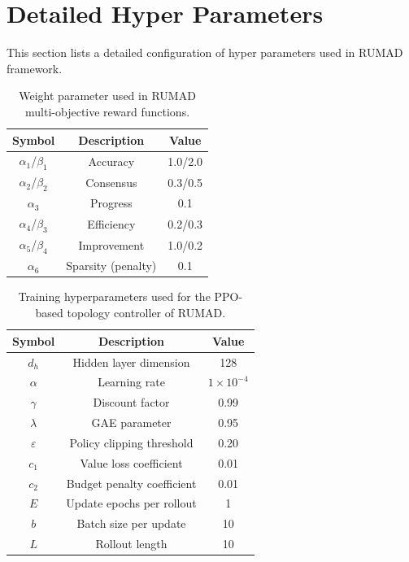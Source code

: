 
\section{Detailed Hyper Parameters}
This section lists a detailed configuration of hyper parameters used in RUMAD framework.

\begin{table}[h]
\setlength{\tabcolsep}{5mm}
\centering
\caption{Weight parameter used in RUMAD multi-objective reward functions.}
\begin{tabular}{ccc}
\toprule
\textbf{Symbol} & \textbf{Description} & \textbf{Value} \\ \midrule
$\alpha_1$/$\beta_1$  & Accuracy              & 1.0/2.0     \\
$\alpha_2$/$\beta_2$  & Consensus             & 0.3/0.5     \\
$\alpha_3$  & Progress              & 0.1     \\
$\alpha_4$/$\beta_3$  & Efficiency            & 0.2/0.3     \\
$\alpha_5$/$\beta_4$  & Improvement           & 1.0/0.2      \\
$\alpha_6$  & Sparsity (penalty)    & 0.1      \\
\bottomrule           
\end{tabular}%
\label{tab:reward_weight_parameter}
\end{table}


\begin{table}[h]
\centering
\caption{Training hyperparameters used for the PPO-based topology controller of RUMAD.}
\begin{tabular}{ccc}
\toprule
{\color[HTML]{000000} \textbf{Symbol}} & \textbf{Description} & {\color[HTML]{000000} \textbf{Value}} \\ \midrule
$d_h$ & Hidden layer dimension & 128 \\
$\alpha$ & Learning rate & $1\times10^{-4}$ \\
$\gamma$ & Discount factor & 0.99 \\
$\lambda$ & GAE parameter & 0.95 \\
$\varepsilon$ & Policy clipping threshold & 0.20 \\
$c_1$ & Value loss coefficient & 0.01 \\
$c_2$ & Budget penalty coefficient & 0.01 \\
$E$ & Update epochs per rollout & 1\\
$b$ & Batch size per update & 10 \\
$L$ & Rollout length & 10 \\
\bottomrule
\end{tabular}%
\label{tab:hyperparameters}
\end{table}


